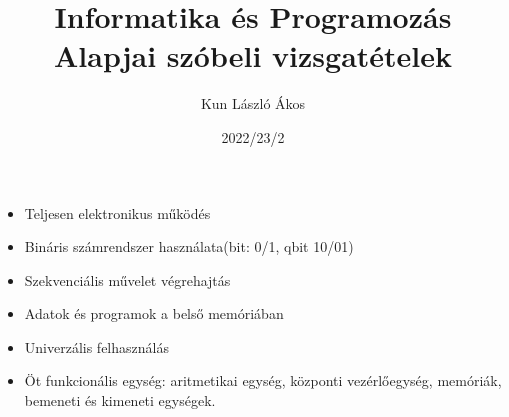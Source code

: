 \documentclass[12pt,a4paper]{article}
\title{Informatika és Programozás Alapjai szóbeli vizsgatételek}
\author{Kun László Ákos}
\date{2022/23/2}
\begin{document}
\maketitle{}

\newpage
            \begin{tcolorbox}[colback=blue!5!white,colframe=blue!50!black,title=1. Ismertesse a Neumann-elveket!]
    \begin{itemize}
        \item Teljesen elektronikus működés
        \item Bináris számrendszer használata(bit: 0/1, qbit 10/01)
        \item Szekvenciális művelet végrehajtás
        \item Adatok és programok a belső memóriában
        \item Univerzális felhasználás
        \item Öt funkcionális egység: aritmetikai egység, központi vezérlőegység, memóriák, bemeneti és kimeneti egységek.
    \end{itemize}
    \begin{center}
    \end{center}
            \end{tcolorbox}
\end{document}
